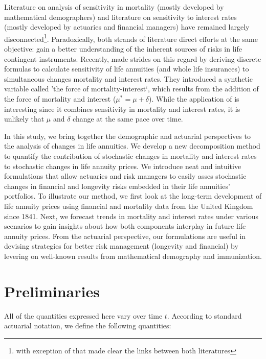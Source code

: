 \documentclass[12pt]{article}
\begin{document}
Literature on analysis of sensitivity in mortality (mostly developed by mathematical demographers) and literature on sensitivity to interest rates (mostly developed by actuaries and financial managers) have remained largely disconnected\footnote{with exception of \citet{Haberman2011} that made clear the links between both literatures}. Paradoxically, both strands of literature direct efforts at the same objective: gain a better understanding of the inherent sources of risks in life contingent instruments. Recently, \citet{lin2020natural} made strides on this regard by deriving discrete formulas to calculate sensitivity of life annuities (and whole life insurances) to simultaneous changes mortality and interest rates. They introduced a synthetic variable called 'the force of mortality-interest`, which results from the addition of the force of mortality and interest ($\mu^*=\mu+\delta$). While the application of \citet{lin2020natural} is interesting since it combines sensitivity in mortality and interest rates, it is unlikely that $\mu$ and $\delta$ change at the same pace over time.

In this study, we bring together the demographic and actuarial perspectives to the analysis of changes in life annuities. We develop a new decomposition method to quantify the contribution of stochastic changes in mortality and interest rates to stochastic changes in life annuity prices. We introduce neat and intuitive formulations that allow actuaries and risk managers to easily asses stochastic changes in financial and longevity risks embedded in their life annuities' portfolios. To illustrate our method, we first look at the long-term development of life annuity prices using financial and mortality data from the United Kingdom since 1841. Next, we forecast trends in mortality and interest rates under various scenarios to gain insights about how both components interplay in future life annuity prices. From the actuarial perspective, our formulations are useful in devising strategies for better risk management (longevity and financial) by levering on well-known results from mathematical demography and immunization.






\section{Preliminaries}\label{preliminaries}

All of the quantities expressed here vary over time $t$. According to standard actuarial notation, we define the following quantities:
\end{document}
